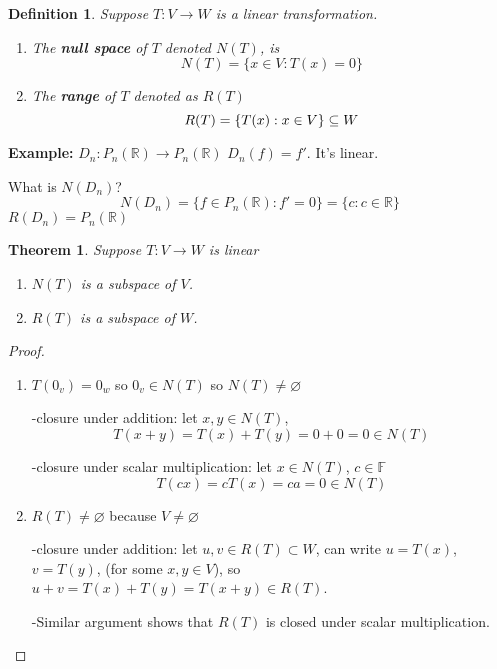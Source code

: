 \documentclass[12pt]{article}
\theoremstyle{plain}
\newtheorem{theorem}{Theorem}[subsection]
\newtheorem{definition}{Definition}[subsection]
\newcommand{\mR}{{\mathbb{R}}}
\newcommand{\mF}{{\mathbb{F}}}
\begin{document}
	\begin{definition}
		Suppose $T : V\to W$ is a linear transformation. 
		\begin{enumerate}
			\item The \textbf{null space} of $T$ denoted $N(T)$, is 
			\[
				N(T) = \{x \in V :T(x) = 0\}
			\]
			\item The \textbf{range} of $T$ denoted as $R(T)$
			\[
				R(T) = \{T(x) : x \in V\} \subseteq W\\
			\]
		\end{enumerate}
	\end{definition}

	{\color{Brown}
		\textbf{Example:} 
		$D_n : P_n(\mR) \to P_n (\mR)$ $D_n(f) = f'$. It's linear. 

		What is $N(D_n)$? 
		\[
			N(D_n) = \{f\in P_n(\mR):f'=0\} = \{c : c\in \mR\}
		\]
		$R(D_n) = P_n(\mR)$ \\
	}

	\begin{theorem}
		Suppose $T : V \to W$ is linear 
		\begin{enumerate}
			\item $N(T)$ is a subspace of $V$. 

			\item $R(T)$ is a subspace of $W$. 
		\end{enumerate}
	\end{theorem}
	\begin{proof}
		$ $
		\begin{enumerate}
			\item $T(0_v) = 0_w$ so $0_v \in N(T)$ so $N(T) \neq \varnothing$

			-closure under addition: let $x, y \in N(T)$, 
			\[
				T(x+y) = T(x) + T(y) = 0+0=0 \in N(T)
			\]

			-closure under scalar multiplication: let $x \in N(T)$, $c\in \mF$
			\[
				T(cx) = c T(x) = ca =0 \in N(T)
			\]
		\item $R(T) \neq \varnothing$ because $V\neq \varnothing$ 
			
			-closure under addition: let $u, v \in R(T) \subset W$,
			can write $u = T(x)$, $v = T(y)$, (for some $x,y \in V$), 
			so $u+v = T(x) + T(y) = T(x+y) \in R(T)$. 

			-Similar argument shows 
			that $R(T)$ is closed under scalar multiplication. 
		\end{enumerate}
	\end{proof}
\end{document}
